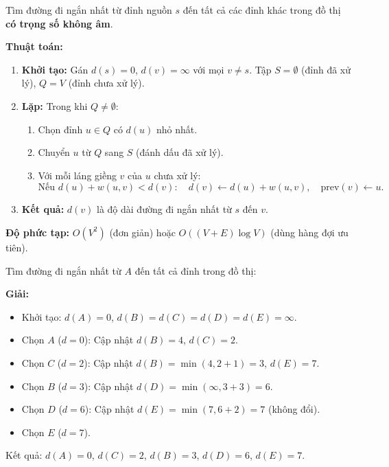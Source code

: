 \documentclass[12pt,a4paper]{article}
\begin{document}
\begin{phuongphap}[title={Thuật toán Dijkstra}]
  Tìm đường đi ngắn nhất từ đỉnh nguồn $s$ đến tất cả các đỉnh khác trong đồ thị \textbf{có trọng số không âm}.

  \textbf{Thuật toán:}
  \begin{enumerate}
    \item \textbf{Khởi tạo:} Gán $d(s) = 0$, $d(v) = \infty$ với mọi $v \ne s$. Tập $S = \emptyset$ (đỉnh đã xử lý), $Q = V$ (đỉnh chưa xử lý).
    \item \textbf{Lặp:} Trong khi $Q \ne \emptyset$:
      \begin{enumerate}
        \item Chọn đỉnh $u \in Q$ có $d(u)$ nhỏ nhất.
        \item Chuyển $u$ từ $Q$ sang $S$ (đánh dấu đã xử lý).
        \item Với mỗi láng giềng $v$ của $u$ chưa xử lý:
          \[
            \text{Nếu } d(u) + w(u,v) < d(v): \quad d(v) \leftarrow d(u) + w(u,v),\quad \text{prev}(v) \leftarrow u.
          \]
      \end{enumerate}
    \item \textbf{Kết quả:} $d(v)$ là độ dài đường đi ngắn nhất từ $s$ đến $v$.
  \end{enumerate}

  \textbf{Độ phức tạp:} $O(V^2)$ (đơn giản) hoặc $O((V+E)\log V)$ (dùng hàng đợi ưu tiên).
\end{phuongphap}

\begin{vidu}
  Tìm đường đi ngắn nhất từ $A$ đến tất cả đỉnh trong đồ thị:

  \begin{center}
  \end{center}

  \medskip\textbf{Giải:}
  \begin{itemize}
    \item Khởi tạo: $d(A)=0$, $d(B)=d(C)=d(D)=d(E)=\infty$.
    \item Chọn $A$ ($d=0$): Cập nhật $d(B)=4$, $d(C)=2$.
    \item Chọn $C$ ($d=2$): Cập nhật $d(B)=\min(4,2+1)=3$, $d(E)=7$.
    \item Chọn $B$ ($d=3$): Cập nhật $d(D)=\min(\infty,3+3)=6$.
    \item Chọn $D$ ($d=6$): Cập nhật $d(E)=\min(7,6+2)=7$ (không đổi).
    \item Chọn $E$ ($d=7$).
  \end{itemize}
  Kết quả: $d(A)=0$, $d(C)=2$, $d(B)=3$, $d(D)=6$, $d(E)=7$.
\end{vidu}
\end{document}

